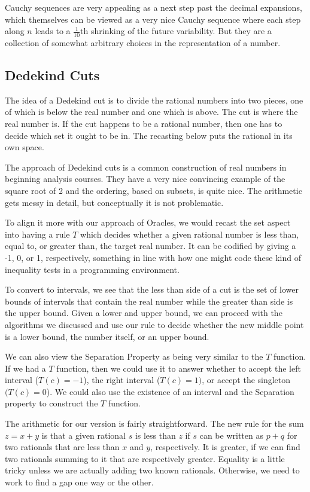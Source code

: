 \documentclass[12pt]{article}
\theoremstyle{remark}
\begin{document}
Cauchy sequences are very appealing as a next step past the decimal expansions, which themselves can be viewed as a very nice Cauchy sequence where each step along $n$ leads to a $\frac{1}{10}$th shrinking of the future variability. But they are a collection of somewhat arbitrary choices in the representation of a number. 
  
\subsection{Dedekind Cuts}

The idea of a Dedekind cut is to divide the rational numbers into two pieces, one of which is below the real number and one which is above. The cut is where the real number is. If the cut happens to be a rational number, then one has to decide which set it ought to be in. The recasting below puts the rational in its own space. 

The approach of Dedekind cuts is a common construction of real numbers in beginning analysis courses. They have a very nice convincing example of the square root of 2 and the ordering, based on subsets, is quite nice. The arithmetic gets messy in detail, but conceptually it is not problematic. 

To align it more with our approach of Oracles, we would recast the set aspect into having a rule $T$ which decides whether a given rational number is less than, equal to, or greater than, the target real number. It can be codified by giving a -1, 0, or 1,  respectively, something in line with how one might code these kind of inequality tests in a programming environment. 

To convert to intervals, we see that the less than side of a cut is the set of lower bounds of intervals that contain the real number while the greater than side is the upper bound. Given a lower and upper bound, we can proceed with the algorithms we discussed and use our rule to decide whether the new middle point is a lower bound, the number itself, or an upper bound. 

We can also view the Separation Property as being very similar to the $T$ function. If we had a $T$ function, then we could use it to answer whether to accept the left interval ($T(c) = -1$), the right interval ($T(c)=1)$, or accept the singleton $(T(c) = 0$). We could also use the existence of an interval and the Separation property to construct the $T$ function.

The arithmetic for our version is fairly straightforward. The new rule for the sum  $z = x+y$ is that a given rational $s$ is less than $z$ if $s$ can be written as $p+q$ for two rationals that are less than $x$ and $y$, respectively. It is greater, if we can find two rationals summing to it that are respectively greater. Equality is a little tricky unless we are actually adding two known rationals. Otherwise, we need to work to find a gap one way or the other. 
\end{document}
